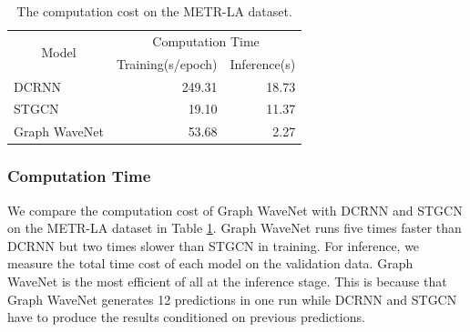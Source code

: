 \begin{table}[tb]
\centering
\begin{tabular}{lllll}
\toprule
\multicolumn{1}{c}{\multirow{2}{*}{Model}} & \multicolumn{4}{c}{Computation Time}                                   \\
\multicolumn{1}{c}{}                       & \multicolumn{2}{l}{Training(s/epoch)} & \multicolumn{2}{l}{Inference(s)} \\
\midrule
DCRNN                                      & \multicolumn{2}{r}{249.31}     & \multicolumn{2}{r}{18.73}      \\
STGCN                                     & \multicolumn{2}{r}{19.10}     & \multicolumn{2}{r}{11.37}      \\
Graph WaveNet                              & \multicolumn{2}{r}{53.68}     &  \multicolumn{2}{r}{2.27}   \\
\bottomrule
\end{tabular}
\caption{The computation cost on the METR-LA dataset.} %
\label{tab:run}
\end{table}


\subsubsection{Computation Time}
We compare the computation cost of Graph WaveNet with DCRNN and STGCN on the METR-LA dataset in Table \ref{tab:run}.  Graph WaveNet runs five times faster than DCRNN but two times slower than STGCN in training. For inference, we measure the total time cost of each model on the validation data. Graph WaveNet is the most efficient of all at the inference stage. This is because that Graph WaveNet generates 12 predictions in one run while DCRNN and STGCN have to produce the results conditioned on previous predictions. 

